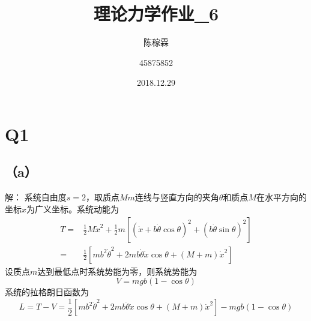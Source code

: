 \documentclass[10pt,a4paper]{article}
\title{理论力学作业\_6}
\author{陈稼霖 \and 45875852}
\date{2018.12.29}
\begin{document}
\maketitle
\section*{Q1}
\subsection*{（a）}解：
系统自由度$s=2$，取质点$Mm$连线与竖直方向的夹角$\theta$和质点$M$在水平方向的坐标$x$为广义坐标。系统动能为
\begin{align*}
T=&\frac{1}{2}M\dot{x}^2+\frac{1}{2}m[(\dot{x}+b\dot{\theta}\cos\theta)^2+ (b\dot{\theta}\sin\theta)^2]\\
=&\frac{1}{2}[mb^2\dot{\theta}^2+2mb\dot{\theta}\dot{x}\cos\theta+(M+m)\dot{x}^2]
\end{align*}
设质点$m$达到最低点时系统势能为零，则系统势能为
\[
V=mgb(1-\cos\theta)
\]
系统的拉格朗日函数为
\[
L=T-V=\frac{1}{2}[mb^2\dot{\theta}^2+2mb\dot{\theta}\dot{x}\cos\theta+(M+m)\dot{x}^2]-mgb(1-\cos\theta)
\]
\end{document}
